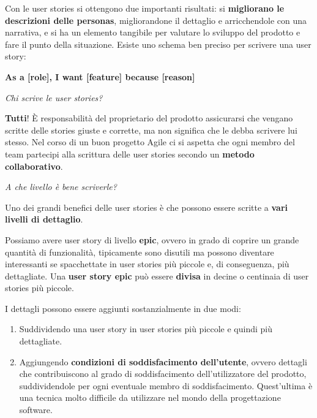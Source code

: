 \documentclass[a4paper,11pt,oneside]{book}
\begin{document}
Con le user stories si ottengono due importanti risultati: si \textbf{migliorano le descrizioni delle personas}, migliorandone il dettaglio e arricchendole con una narrativa, e si ha un elemento tangibile per valutare lo sviluppo del prodotto e fare il punto della situazione.
Esiste uno schema ben preciso per scrivere una user story:

\begin{center}
	\textbf{\large As a [role], I want [feature] because [reason]}
\end{center}

\begin{flushleft}
	\textit{Chi scrive le user stories?}
\end{flushleft}

\textbf{Tutti}! È responsabilità del proprietario del prodotto assicurarsi che vengano scritte delle stories giuste e corrette, ma non significa che le debba
scrivere lui stesso. Nel corso di un buon progetto Agile ci si aspetta che ogni membro del team partecipi alla scrittura delle user stories secondo un \textbf{metodo collaborativo}.

\pagebreak

\begin{flushleft}
	\textit{A che livello è bene scriverle?}
\end{flushleft}

Uno dei grandi benefici delle user stories è che possono essere
scritte a \textbf{vari livelli di dettaglio}.

Possiamo avere user story di livello \textbf{epic}, ovvero in grado di
coprire un grande quantità di funzionalità, tipicamente sono disutili ma possono diventare interessanti se spacchettate in user stories più piccole e, di conseguenza, più dettagliate. Una \textbf{user story epic} può essere \textbf{divisa} in decine o centinaia di user stories più piccole.

I dettagli possono essere aggiunti sostanzialmente in due modi:
\begin{enumerate}
	\item Suddividendo una user story in user stories più piccole e quindi più dettagliate.
	\item Aggiungendo \textbf{condizioni di soddisfacimento dell'utente}, ovvero  dettagli che contribuiscono al grado di soddisfacimento dell'utilizzatore del prodotto, suddividendole per ogni eventuale membro di soddisfacimento. Quest'ultima è una tecnica molto difficile da utilizzare nel mondo della progettazione software.
\end{enumerate}
\end{document}
